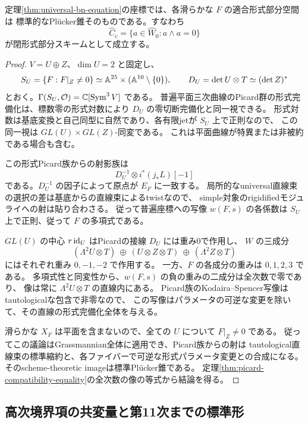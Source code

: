 \begin{lemma}[同じ普遍座標での適合部分空間]
\label{lem:universal-chart-plucker}
定理\ref{thm:universal-bn-equation}の座標では、各滑らかな $F$ の適合形式部分空間は
標準的なPl\"ucker錐そのものである。すなわち
\[
             \widehat C_c=\{a\in\widehat W_0:a\wedge a=0\}
\]
が閉形式部分スキームとして成立する。
\end{lemma}

\begin{proof}
$V=U\oplus Z$、$\dim U=2$ と固定し、
\[
 S_U=\{F:F|_Z\ne0\}
      \simeq\mathbb A^{25}\times(\mathbb A^{10}\setminus\{0\}),\qquad
 D_U=\det U\otimes T\simeq(\det Z)^*
\]
とおく。$\Gamma(S_U,\mathcal O)=\mathbb C[\operatorname{Sym}^3V]$ である。
普遍平面三次曲線のPicard群の形式完備化は、標数零の形式対数により
$D_U$ の零切断完備化と同一視できる。
形式対数は基底変換と自己同型に自然であり、各有限jetが $S_U$ 上で正則なので、
この同一視は $GL(U)\times GL(Z)$-同変である。
これは平面曲線が特異または非被約である場合も含む。

この形式Picard族からの射影族は
\[
                    D_U^{-1}\otimes i^*(j_*L)[-1]
\]
である。$D_U^{-1}$ の因子によって原点が $E_F$ に一致する。
局所的なuniversal直線束の選択の差は基底からの直線束によるtwistなので、
simple対象のrigidifiedモジュライへの射は貼り合わさる。
従って普遍座標への写像 $w(F,s)$ の各係数は $S_U$ 上で正則、従って $F$ の多項式である。

$GL(U)$ の中心 $r\operatorname{id}_U$ はPicardの接線 $D_U$ には重み0で作用し、
$W$ の三成分
\[
 (\Lambda^2U\otimes T)\ \oplus\ (U\otimes Z\otimes T)
                         \ \oplus\ (\Lambda^2Z\otimes T)
\]
にはそれぞれ重み $0,-1,-2$ で作用する。
一方、$F$ の各成分の重みは $0,1,2,3$ である。
多項式性と同変性から、$w(F,s)$ の負の重みの二成分は全次数で零であり、
像は常に $\Lambda^2U\otimes T$ の直線内にある。
Picard族のKodaira--Spencer写像はtautologicalな包含で非零なので、
この写像はパラメータの可逆な変更を除いて、その直線の形式完備化全体を与える。

滑らかな $X_F$ は平面を含まないので、全ての $U$ について $F|_Z\ne0$ である。
従ってこの議論はGrassmannian全体に適用でき、Picard族からの射は
tautological直線束の標準縮約と、各ファイバーで可逆な形式パラメータ変更との合成になる。
そのscheme-theoretic imageは標準Pl\"ucker錐である。
定理\ref{thm:picard-compatibility-equality}の全次数の像の等式から結論を得る。
\end{proof}


\subsection{高次境界項の共変量と第11次までの標準形}
\label{subsec:boundary-higher-jets}


